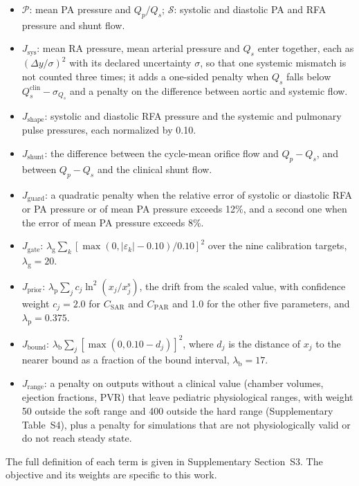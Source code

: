 \documentclass{article}
\begin{document}
\begin{itemize}[leftmargin=1.5em,itemsep=1pt]
\item $\mathcal{P}$: mean PA pressure and $Q_p/Q_s$; $\mathcal{S}$: systolic and diastolic PA and RFA pressure and shunt flow.
\item $J_{\mathrm{sys}}$: mean RA pressure, mean arterial pressure and $Q_s$ enter together, each as $(\Delta y/\sigma)^2$ with its declared uncertainty $\sigma$, so that one systemic mismatch is not counted three times; it adds a one-sided penalty when $Q_s$ falls below $Q_s^{\mathrm{clin}} - \sigma_{Q_s}$ and a penalty on the difference between aortic and systemic flow.
\item $J_{\mathrm{shape}}$: systolic and diastolic RFA pressure and the systemic and pulmonary pulse pressures, each normalized by 0.10.
\item $J_{\mathrm{shunt}}$: the difference between the cycle-mean orifice flow and $Q_p - Q_s$, and between $Q_p - Q_s$ and the clinical shunt flow.
\item $J_{\mathrm{guard}}$: a quadratic penalty when the relative error of systolic or diastolic RFA or PA pressure or of mean PA pressure exceeds 12\%, and a second one when the error of mean PA pressure exceeds 8\%.
\item $J_{\mathrm{gate}}$: $\lambda_{\mathrm{g}}\sum_{k}[\max(0,\lvert\varepsilon_k\rvert - 0.10)/0.10]^2$ over the nine calibration targets, $\lambda_{\mathrm{g}} = 20$.
\item $J_{\mathrm{prior}}$: $\lambda_{\mathrm{p}}\sum_{j} c_j \ln^{2}(x_j/x_j^{\mathrm{s}})$, the drift from the scaled value, with confidence weight $c_j = 2.0$ for $C_{\mathrm{SAR}}$ and $C_{\mathrm{PAR}}$ and 1.0 for the other five parameters, and $\lambda_{\mathrm{p}} = 0.375$.
\item $J_{\mathrm{bound}}$: $\lambda_{\mathrm{b}}\sum_{j}[\max(0, 0.10 - d_j)]^2$, where $d_j$ is the distance of $x_j$ to the nearer bound as a fraction of the bound interval, $\lambda_{\mathrm{b}} = 17$.
\item $J_{\mathrm{range}}$: a penalty on outputs without a clinical value (chamber volumes, ejection fractions, PVR) that leave pediatric physiological ranges, with weight 50 outside the soft range and 400 outside the hard range (Supplementary Table~S4), plus a penalty for simulations that are not physiologically valid or do not reach steady state.
\end{itemize}
The full definition of each term is given in Supplementary Section~S3. The objective and its weights are specific to this work.
\end{document}
